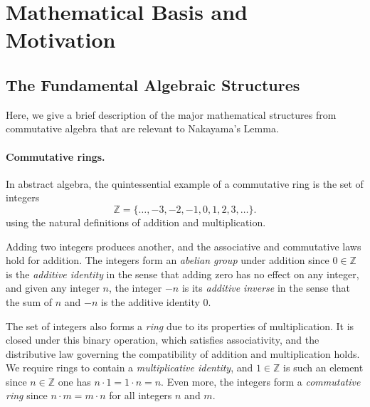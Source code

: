 \documentclass{article}
\begin{document}

\section{Mathematical Basis and Motivation}
\subsection{The Fundamental Algebraic Structures}
Here, we give a brief description of the major mathematical structures from
commutative algebra that are relevant to Nakayama's Lemma.

\paragraph{Commutative rings.}
In abstract algebra, the quintessential example of a commutative ring is the
set of integers
\[\mathbb{Z} = \{ \ldots, -3, -2, -1, 0, 1, 2, 3, \ldots \}.\]
using the natural definitions of addition and multiplication.

Adding two integers produces another, and the associative and commutative laws
hold for addition. The integers form an \emph{abelian group} under addition
since $0 \in \mathbb{Z}$ is the \emph{additive identity} in the sense that
adding zero has no effect on any integer, and given any integer $n$, the
integer $-n$ is its \emph{additive inverse} in the sense that the sum of $n$
and $-n$ is the additive identity $0$. 

The set of integers also forms a \emph{ring} due to its properties of
multiplication. It is closed under this binary operation, which satisfies
associativity, and the distributive law governing the compatibility of addition
and multiplication holds.  We require rings to contain a \emph{multiplicative identity},
and $1 \in \mathbb{Z}$ is such an element since $n \in \mathbb{Z}$ one has
$n \cdot 1 = 1 \cdot n = n$. 
Even more, the integers form a
\emph{commutative ring} since $n \cdot m = m \cdot n$ for all integers $n$ and
$m$. 
\end{document}
